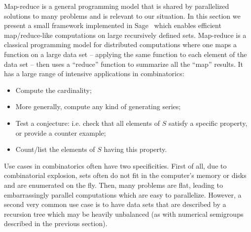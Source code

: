 \documentclass{deliverablereport}
\begin{document}
Map-reduce is a general programming model that is shared by
parallelized solutions to many problems and is relevant to our situation. In this section we
present a small framework implemented in Sage~\cite{sage} which enables
efficient map/reduce-like computations on
large recursively defined sets. Map-reduce is a classical programming model
for distributed computations where one maps a function on a large data set --
applying the same function to each element of the data set -- then
uses a ``reduce'' function to summarize all the ``map'' results. It has a
large range of intensive applications in combinatorics:
\begin{itemize}
  \item Compute the cardinality;
  \item More generally, compute any kind of generating series;
  \item Test a conjecture: i.e. check that all elements of $S$ satisfy a specific
    property, or provide a counter example;
  \item Count/list the elements of $S$ having this property.
\end{itemize}
Use cases in combinatorics often have two specificities. First of all, due to
combinatorial explosion, sets often do not fit in the computer's memory or
disks and are enumerated on the fly. Then, many problems are flat, leading to
embarrassingly parallel computations which are easy to parallelize. However, a
second very common use case is to have data sets that are described by a
recursion tree which may be heavily unbalanced (as with numerical semigroups
described in the previous section).
\end{document}
